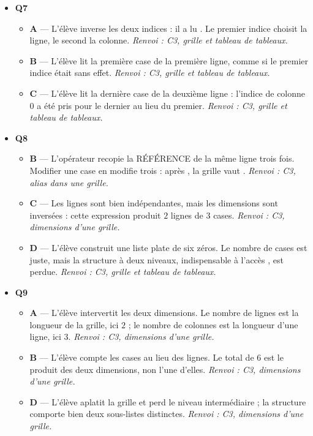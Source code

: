 \begin{itemize}
\begin{itemize}
  \end{itemize}
  \item \textbf{Q7}
  \begin{itemize}
    \item \textbf{A} — L'élève inverse les deux indices : il a lu . Le premier indice choisit la ligne, le second la colonne. \emph{Renvoi : C3, grille et tableau de tableaux.}
    \item \textbf{B} — L'élève lit la première case de la première ligne, comme si le premier indice était sans effet. \emph{Renvoi : C3, grille et tableau de tableaux.}
    \item \textbf{C} — L'élève lit la dernière case de la deuxième ligne : l'indice de colonne $0$ a été pris pour le dernier au lieu du premier. \emph{Renvoi : C3, grille et tableau de tableaux.}
  \end{itemize}
  \item \textbf{Q8}
  \begin{itemize}
    \item \textbf{B} — L'opérateur \code{*} recopie la RÉFÉRENCE de la même ligne trois fois. Modifier une case en modifie trois : après , la grille vaut \code{[[9, 0], [9, 0], [9, 0]]}. \emph{Renvoi : C3, alias dans une grille.}
    \item \textbf{C} — Les lignes sont bien indépendantes, mais les dimensions sont inversées : cette expression produit $2$ lignes de $3$ cases. \emph{Renvoi : C3, dimensions d'une grille.}
    \item \textbf{D} — L'élève construit une liste plate de six zéros. Le nombre de cases est juste, mais la structure à deux niveaux, indispensable à l'accès , est perdue. \emph{Renvoi : C3, grille et tableau de tableaux.}
  \end{itemize}
  \item \textbf{Q9}
  \begin{itemize}
    \item \textbf{A} — L'élève intervertit les deux dimensions. Le nombre de lignes est la longueur de la grille, ici $2$ ; le nombre de colonnes est la longueur d'une ligne, ici $3$. \emph{Renvoi : C3, dimensions d'une grille.}
    \item \textbf{B} — L'élève compte les cases au lieu des lignes. Le total de $6$ est le produit des deux dimensions, non l'une d'elles. \emph{Renvoi : C3, dimensions d'une grille.}
    \item \textbf{D} — L'élève aplatit la grille et perd le niveau intermédiaire ; la structure comporte bien deux sous-listes distinctes. \emph{Renvoi : C3, dimensions d'une grille.}

\end{itemize}
\end{itemize}
